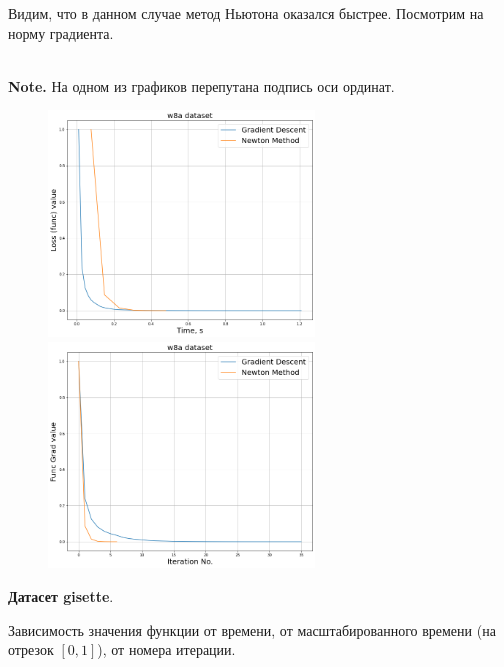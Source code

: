 \documentclass[14pt]{article}
\begin{document}
 Видим, что в данном случае метод Ньютона оказался быстрее. Посмотрим на норму градиента.
 
 \\ \textbf{Note.} На одном из графиков перепутана подпись оси ординат.
 
 \begin{figure}[h]
	\centering
	\includegraphics[height=6cm]{w8a_grad.png}
	\includegraphics[height=6cm]{w8a_grad_no.png}
\end{figure}

\newpage

\textbf{Датасет gisette}.

Зависимость значения функции от времени, от масштабированного времени (на отрезок $[0, 1]$), от номера итерации.
\end{document}
